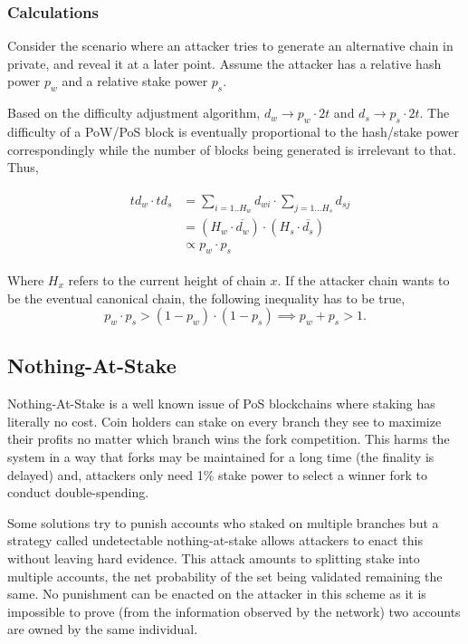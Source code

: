 \documentclass[a4paper]{article}
\begin{document}
\subsubsection{Calculations}

Consider the scenario where an attacker tries to generate an alternative chain in private, and reveal it at a later point. Assume the attacker has a relative hash power $p_w$ and a relative stake power $p_s$.

Based on the difficulty adjustment algorithm,  $d_w \to p_w \cdot 2t$ and $d_s \to p_s \cdot 2t$. The difficulty of a PoW/PoS block is eventually proportional to the hash/stake power correspondingly while the number of blocks being generated is irrelevant to that. Thus,

\begin{equation}
\begin{split}
&\begin{aligned}
td_w \cdot td_s &= \sum_{i = 1..H_w}{d_{wi}} \cdot \sum_{j = 1...H_s}{d_{sj}} \\
&= (H_w \cdot \overline{d_{w}}) \cdot (H_s \cdot \overline{d_{s}}) \\
&\propto p_w \cdot p_s
\end{aligned}
\end{split}
\end{equation}

Where $H_x$ refers to the current height of chain $x$. If the attacker chain wants to be the eventual canonical chain, the following inequality has to be true,
\begin{equation}
p_w \cdot p_s > (1 - p_w) \cdot (1 - p_s) \implies p_w + p_s > 1.
\end{equation}


\subsection{Nothing-At-Stake}
\label{sec:nothing_at_stake}

Nothing-At-Stake is a well known issue of PoS blockchains where staking has literally no cost. Coin holders can stake on every branch they see to maximize their profits no matter which branch wins the fork competition. This harms the system in a way that forks may be maintained for a long time (the finality is delayed) and, attackers only need 1\% stake power to select a winner fork to conduct double-spending.

Some solutions try to punish accounts who staked on multiple branches but a strategy called undetectable nothing-at-stake\cite{brown2018formal} allows attackers to enact this without leaving hard evidence. This attack amounts to splitting stake into multiple accounts, the net probability of the set being validated remaining the same. No punishment can be enacted on the attacker in this scheme as it is impossible to prove (from the information observed by the network) two accounts are owned by the same individual.
\end{document}
